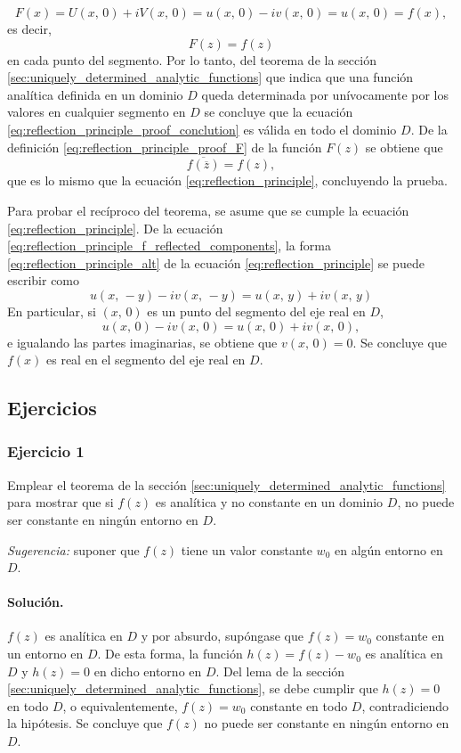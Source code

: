 \documentclass[a4paper]{report}
\begin{document}
\[
 F(x)=U(x,\,0)+iV(x,\,0)=u(x,\,0)-iv(x,\,0)=u(x,\,0)=f(x),
\]
es decir,
\begin{equation}\label{eq:reflection_principle_proof_conclution}
 F(z)=f(z)
\end{equation}
en cada punto del segmento. Por lo tanto, del teorema de la sección \ref{sec:uniquely_determined_analytic_functions} que indica que una función analítica definida en un dominio \(D\) queda determinada por unívocamente por los valores en cualquier segmento en \(D\) se concluye que la ecuación \ref{eq:reflection_principle_proof_conclution} es válida en todo el dominio \(D\). De la definición \ref{eq:reflection_principle_proof_F} de la función \(F(z)\) se obtiene que 
\begin{equation}\label{eq:reflection_principle_alt}
 \overline{f(\overline{z})}=f(z), 
\end{equation}
que es lo mismo que la ecuación \ref{eq:reflection_principle}, concluyendo la prueba.

Para probar el recíproco del teorema, se asume que se cumple la ecuación \ref{eq:reflection_principle}. De la ecuación \ref{eq:reflection_principle_f_reflected_components}, la forma \ref{eq:reflection_principle_alt} de la ecuación \ref{eq:reflection_principle} se puede escribir como 
\[
 u(x,\,-y)-iv(x,\,-y)=u(x,\,y)+iv(x,\,y)
\]
En particular, si \((x,\,0)\) es un punto del segmento del eje real en \(D\),
\[
 u(x,\,0)-iv(x,\,0)=u(x,\,0)+iv(x,\,0),
\]
e igualando las partes imaginarias, se obtiene que \(v(x,\,0)=0\). Se concluye que \(f(x)\) es real en el segmento del eje real en \(D\). 

\subsection*{Ejercicios}

\subsubsection{Ejercicio 1}

Emplear el teorema de la sección \ref{sec:uniquely_determined_analytic_functions} para mostrar que si  \(f(z)\) es analítica y no constante en un dominio \(D\), no puede ser constante en ningún entorno en \(D\).

\emph{Sugerencia:} suponer que \(f(z)\) tiene un valor constante \(w_0\) en algún entorno en \(D\).

\paragraph{Solución.} \(f(z)\) es analítica en \(D\) y por absurdo, supóngase que \(f(z)=w_0\) constante en un entorno en \(D\). De esta forma, la función \(h(z)=f(z)-w_0\) es analítica en \(D\) y \(h(z)=0\) en dicho entorno en \(D\). Del lema de la sección \ref{sec:uniquely_determined_analytic_functions}, se debe  cumplir que \(h(z)=0\) en todo \(D\), o equivalentemente, \(f(z)=w_0\) constante en todo \(D\), contradiciendo la hipótesis. Se concluye que \(f(z)\) no puede ser constante en ningún entorno en \(D\).
\end{document}

